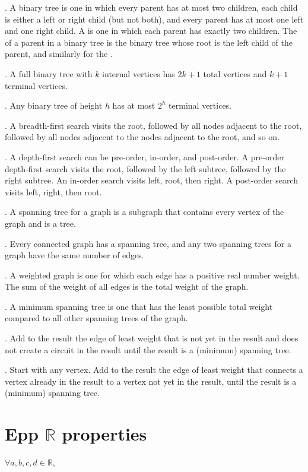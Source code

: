 \documentclass{slnotes}
\begin{document}
. A binary tree is one in which every parent has at most two children, each child is either a left or right child (but not both), and every parent has at most one left and one right child. A  is one in which each parent has exactly two children. The  of a parent in a binary tree is the binary tree whose root is the left child of the parent, and similarly for the .

. A full binary tree with \(k\) internal vertices has \(2k+1\) total vertices and \(k+1\) terminal vertices.

. Any binary tree of height \(h\) has at most \(2^h\) terminal vertices.

. A breadth-first search visits the root, followed by all nodes adjacent to the root, followed by all nodes adjacent to the nodes adjacent to the root, and so on.

. A depth-first search can be pre-order, in-order, and post-order. A pre-order depth-first search visits the root, followed by the left subtree, followed by the right subtree. An in-order search visits left, root, then right. A post-order search visits left, right, then root.

. A spanning tree for a graph is a subgraph that contains every vertex of the graph and is a tree.

. Every connected graph has a spanning tree, and any two spanning trees for a graph have the same number of edges.

. A weighted graph is one for which each edge has a positive real number weight. The sum of the weight of all edges is the total weight of the graph.

. A minimum spanning tree is one that has the least possible total weight compared to all other spanning trees of the graph.

. Add to the result the edge of least weight that is not yet in the result and does not create a circuit in the result until the result is a (minimum) spanning tree.

. Start with any vertex. Add to the result the edge of least weight that connects a vertex already in the result to a vertex not yet in the result, until the result is a (minimum) spanning tree.
\chapter{Epp \(\mathbb{R}\) properties}
\(\forall a,b,c,d \in \mathbb{R}\),
\end{document}
